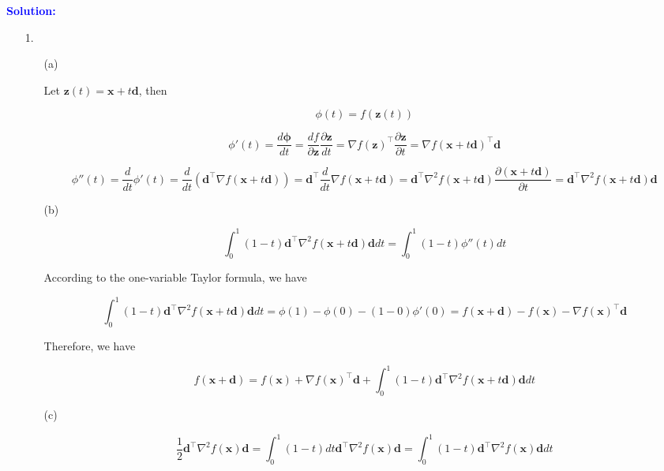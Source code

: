\documentclass[10pt,a4paper]{article}
\newcommand{\solution}{\par\medskip
    \textcolor{blue}{\textbf{Solution:}}\par\smallskip}
\begin{document}
\solution
\begin{enumerate}
    \item[1. ]
    \begin{enumerate}
        \item[(a)]
        
        Let $\mathbf{z}(t) = \mathbf{x} + t\mathbf{d}$, then

        $$
        \phi(t) = f(\mathbf{z}(t))
        $$

        $$
        \phi'(t)
        =\frac{d \mathbf{\phi}}{dt}
        = \frac{df}{\partial \mathbf{z}} \frac{\partial \mathbf{z}}{dt}
        = \nabla f(\mathbf{z})^\top \frac{\partial \mathbf{z}}{\partial t}
        = \nabla f(\mathbf{x} + t\mathbf{d})^\top \mathbf{d}
        $$

        $$
        \phi''(t)
        = \frac{d}{dt} \phi'(t)
        = \frac{d}{dt} (\mathbf{d}^\top \nabla f(\mathbf{x} + t\mathbf{d}))
        = \mathbf{d}^\top \frac{d}{dt} \nabla f(\mathbf{x} + t\mathbf{d}) 
        = \mathbf{d}^\top \nabla^2 f(\mathbf{x} + t\mathbf{d}) \frac{\partial (\mathbf{x} + t\mathbf{d})}{\partial t}
        = \mathbf{d}^\top \nabla^2 f(\mathbf{x} + t\mathbf{d}) \mathbf{d}
        $$

        \item[(b)]
        
        $$
        \int_0^1 (1-t) \mathbf{d}^\top \nabla^2 f(\mathbf{x} + t\mathbf{d}) \mathbf{d} dt
        = \int_0^1 (1-t) \phi''(t) dt
        $$

        According to the one-variable Taylor formula, we have

        $$
        \int_0^1 (1-t) \mathbf{d}^\top \nabla^2 f(\mathbf{x} + t\mathbf{d}) \mathbf{d} dt
        = \phi(1) - \phi(0) - (1-0)\phi'(0)
        = f(\mathbf{x} + \mathbf{d}) - f(\mathbf{x}) - \nabla f(\mathbf{x})^\top \mathbf{d}
        $$

        Therefore, we have

        $$
        f(\mathbf{x} + \mathbf{d}) = f(\mathbf{x}) + \nabla f(\mathbf{x})^\top \mathbf{d} + \int_0^1 (1-t) \mathbf{d}^\top \nabla^2 f(\mathbf{x} + t\mathbf{d}) \mathbf{d} dt
        $$

        \item[(c)]
        
        $$
        \frac12 \mathbf{d}^\top \nabla^2 f(\mathbf{x}) \mathbf{d} = \int_0^1 (1-t) dt \mathbf{d}^\top \nabla^2 f(\mathbf{x}) \mathbf{d} = \int_0^1 (1-t) \mathbf{d}^\top \nabla^2 f(\mathbf{x}) \mathbf{d} dt  
        $$


\end{enumerate}
\end{enumerate}
\end{document}
